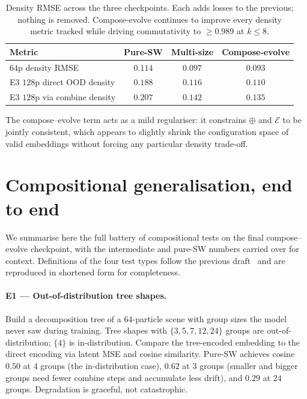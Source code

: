 \documentclass[11pt]{article}
\newcommand{\combine}{\oplus}
\newcommand{\evolve}{\mathcal{E}}
\begin{document}
\begin{table}[t]
\centering
\caption{Density RMSE across the three checkpoints. Each adds losses to the previous; nothing is removed. Compose-evolve continues to improve every density metric tracked while driving commutativity to $\ge 0.989$ at $k \le 8$.}
\label{tab:density-progression}
\begin{tabular}{lccc}
\toprule
Metric & Pure-SW & Multi-size & Compose-evolve \\
\midrule
$64$p density RMSE & $0.114$ & $0.097$ & $\mathbf{0.093}$ \\
E3 $128$p direct OOD density & $0.188$ & $0.116$ & $\mathbf{0.110}$ \\
E3 $128$p via combine density & $0.207$ & $0.142$ & $\mathbf{0.135}$ \\
\bottomrule
\end{tabular}
\end{table}

The compose--evolve term acts as a mild regulariser: it constrains $\combine$ and $\evolve$ to be jointly consistent, which appears to slightly shrink the configuration space of valid embeddings without forcing any particular density trade-off.

\section{Compositional generalisation, end to end}
\label{sec:compositional}

We summarise here the full battery of compositional tests on the final compose--evolve checkpoint, with the intermediate and pure-SW numbers carried over for context. Definitions of the four test types follow the previous draft~\cite{rabin2011wasserstein} and are reproduced in shortened form for completeness.

\paragraph{E1 --- Out-of-distribution tree shapes.} Build a decomposition tree of a $64$-particle scene with group sizes the model never saw during training. Tree shapes with $\{3, 5, 7, 12, 24\}$ groups are out-of-distribution; $\{4\}$ is in-distribution. Compare the tree-encoded embedding to the direct encoding via latent MSE and cosine similarity. Pure-SW achieves cosine $0.50$ at $4$ groups (the in-distribution case), $0.62$ at $3$ groups (smaller and bigger groups need fewer combine steps and accumulate less drift), and $0.29$ at $24$ groups. Degradation is graceful, not catastrophic.
\end{document}
